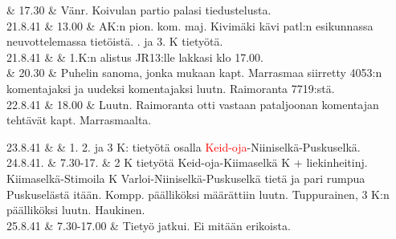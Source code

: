 \documentclass[11pt,a5paper,oneside]{book}
\begin{document}
& 17.30 & Vänr. Koivulan partio palasi tiedustelusta. \newline\newline\newline \\

21.8.41 & 13.00 &  AK:n pion. kom. maj. Kivimäki kävi patl:n esikunnassa neuvottelemassa tietöistä. . ja 3. K tietyötä. \newline \\

21.8.41 & & 1.K:n alistus JR13:lle lakkasi klo 17.00. \\

& 20.30 & Puhelin sanoma, jonka mukaan kapt. Marrasmaa siirretty 4053:n komentajaksi ja uudeksi komentajaksi luutn. Raimoranta 7719:stä. \newline \\

22.8.41 & 18.00 & Luutn. Raimoranta otti vastaan pataljoonan komentajan tehtävät kapt. Marrasmaalta. \\
\newpage

23.8.41 & & 1. 2. ja 3 K: tietyötä osalla \textcolor{red}{Keid-oja}-Niiniselkä-Puskuselkä. \newline\newline \\

24.8.41. & 7.30-17. & 2 K tietyötä Keid-oja-Kiimaselkä  K + liekinheitinj. Kiimaselkä-Stimoila  K Varloi-Niiniselkä-Puskuselkä tietä ja pari rumpua Puskuselästä itään.  Kompp. päälliköksi määrättiin luutn. Tuppurainen, 3 K:n päälliköksi luutn. Haukinen. \newline \\

25.8.41 & 7.30-17.00 & Tietyö jatkui. Ei mitään erikoista. \\

\taulustop

\end{document}
